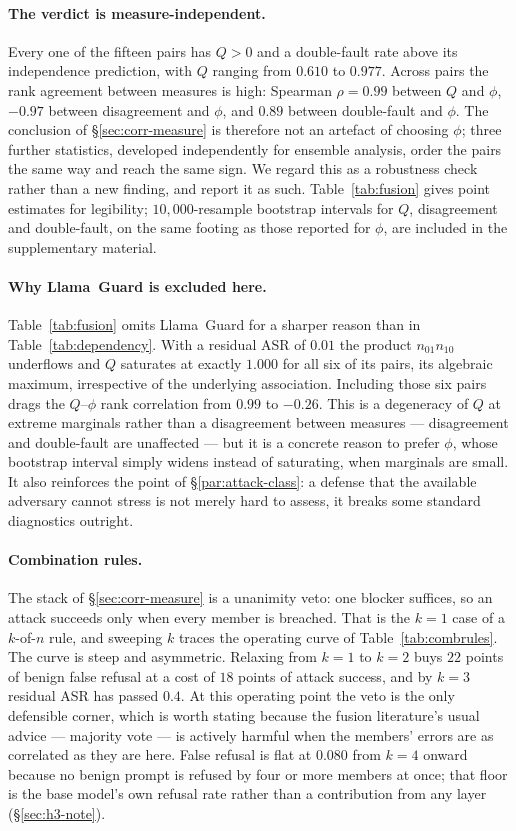 \paragraph{The verdict is measure-independent.}
Every one of the fifteen pairs has $Q>0$ and a double-fault rate above its independence
prediction, with $Q$ ranging from $0.610$ to $0.977$. Across pairs the rank agreement
between measures is high: Spearman $\rho=0.99$ between $Q$ and $\phi$, $-0.97$ between
disagreement and $\phi$, and $0.89$ between double-fault and $\phi$. The conclusion of
\S\ref{sec:corr-measure} is therefore not an artefact of choosing $\phi$; three further
statistics, developed independently for ensemble analysis, order the pairs the same way and
reach the same sign. We regard this as a robustness check rather than a new finding, and
report it as such. Table~\ref{tab:fusion} gives point estimates for legibility; $10{,}000$-resample
bootstrap intervals for $Q$, disagreement and double-fault, on the same footing as those
reported for $\phi$, are included in the supplementary material.

\paragraph{Why Llama~Guard is excluded here.}
Table~\ref{tab:fusion} omits Llama~Guard for a sharper reason than in
Table~\ref{tab:dependency}. With a residual ASR of $0.01$ the product $n_{01}n_{10}$
underflows and $Q$ saturates at exactly $1.000$ for all six of its pairs, its algebraic
maximum, irrespective of the underlying association. Including those six pairs drags the
$Q$--$\phi$ rank correlation from $0.99$ to $-0.26$. This is a degeneracy of $Q$ at extreme
marginals rather than a disagreement between measures --- disagreement and double-fault are
unaffected --- but it is a concrete reason to prefer $\phi$, whose bootstrap interval simply
widens instead of saturating, when marginals are small. It also reinforces the point of
\S\ref{par:attack-class}: a defense that the available adversary cannot stress is not merely
hard to assess, it breaks some standard diagnostics outright.

\paragraph{Combination rules.}
The stack of \S\ref{sec:corr-measure} is a unanimity veto: one blocker suffices, so an attack
succeeds only when every member is breached. That is the $k=1$ case of a $k$-of-$n$ rule, and
sweeping $k$ traces the operating curve of Table~\ref{tab:combrules}. The curve is steep and
asymmetric. Relaxing from $k=1$ to $k=2$ buys $22$ points of benign false refusal at a cost
of $18$ points of attack success, and by $k=3$ residual ASR has passed $0.4$. At this
operating point the veto is the only defensible corner, which is worth stating because the
fusion literature's usual advice --- majority vote --- is actively harmful when the members'
errors are as correlated as they are here. False refusal is flat at $0.080$ from $k=4$ onward
because no benign prompt is refused by four or more members at once; that floor is the base
model's own refusal rate rather than a contribution from any layer (\S\ref{sec:h3-note}).

